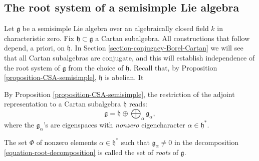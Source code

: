 \subsection{The root system of a semisimple Lie algebra}
\label{subsection-root-systems}

Let $\mathfrak g$ be a semisimple Lie algebra over an algebraically closed field $k$ in characteristic zero. Fix $\mathfrak h\subset \mathfrak g$ a Cartan subalgebra. All constructions that follow depend, a priori, on $\mathfrak h$. In Section \ref{section-conjugacy-Borel-Cartan} we will see that all Cartan subalgebras are conjugate, and this will establish independence of the root system of $\mathfrak g$ from the choice of $\mathfrak h$. Recall that, by Proposition \ref{proposition-CSA-semisimple}, $\mathfrak h$ is abelian. It


By Proposition \ref{proposition-CSA-semisimple}, the restriction of the adjoint representation to a Cartan subalgebra $\mathfrak h$ reads:
\begin{equation}
 \label{equation-root-decomposition}\mathfrak g = \mathfrak h \oplus \bigoplus_{\alpha}  \mathfrak g_\alpha,
\end{equation}
where the $\mathfrak g_\alpha$'s are eigenspaces with \emph{nonzero} eigencharacter $\alpha \in \mathfrak h^*$.


\begin{definition}
 \label{definition-roots}
The set $\Phi$ of nonzero elements $\alpha \in \mathfrak h^*$ such that $\mathfrak g_\alpha\ne 0$ in the decomposition \eqref{equation-root-decomposition} is called the set of {\it roots} of $\mathfrak g$.
\end{definition}

